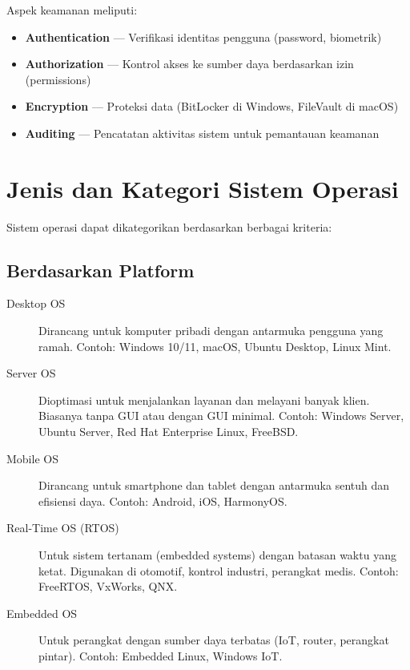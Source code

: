 Aspek keamanan meliputi:
\begin{itemize}
    \item \textbf{Authentication} --- Verifikasi identitas pengguna (password, biometrik)
    \item \textbf{Authorization} --- Kontrol akses ke sumber daya berdasarkan izin (permissions)
    \item \textbf{Encryption} --- Proteksi data (BitLocker di Windows, FileVault di macOS)
    \item \textbf{Auditing} --- Pencatatan aktivitas sistem untuk pemantauan keamanan
\end{itemize}

\section{Jenis dan Kategori Sistem Operasi}
\label{sec:os-categories}

Sistem operasi dapat dikategorikan berdasarkan berbagai kriteria:

\subsection{Berdasarkan Platform}

\begin{description}
    \item[Desktop OS] Dirancang untuk komputer pribadi dengan antarmuka pengguna yang ramah. Contoh: Windows 10/11, macOS, Ubuntu Desktop, Linux Mint.

    \item[Server OS] Dioptimasi untuk menjalankan layanan dan melayani banyak klien. Biasanya tanpa GUI atau dengan GUI minimal. Contoh: Windows Server, Ubuntu Server, Red Hat Enterprise Linux, FreeBSD.

    \item[Mobile OS] Dirancang untuk smartphone dan tablet dengan antarmuka sentuh dan efisiensi daya. Contoh: Android, iOS, HarmonyOS.

    \item[Real-Time OS (RTOS)] Untuk sistem tertanam (embedded systems) dengan batasan waktu yang ketat. Digunakan di otomotif, kontrol industri, perangkat medis. Contoh: FreeRTOS, VxWorks, QNX.

    \item[Embedded OS] Untuk perangkat dengan sumber daya terbatas (IoT, router, perangkat pintar). Contoh: Embedded Linux, Windows IoT.
\end{description}

